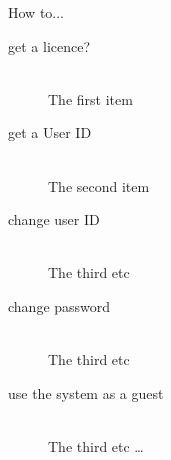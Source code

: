How to...

\begin{description}
 	\item[get a licence?] \hfill \\
 		The first item
 	\item[get a User ID] \hfill \\
		 The second item
 	\item[change user ID] \hfill \\
 		The third etc 
	\item[change password] \hfill \\
 		The third etc 
	\item[use the system as a guest] \hfill \\
 		The third etc \ldots
\end{description}